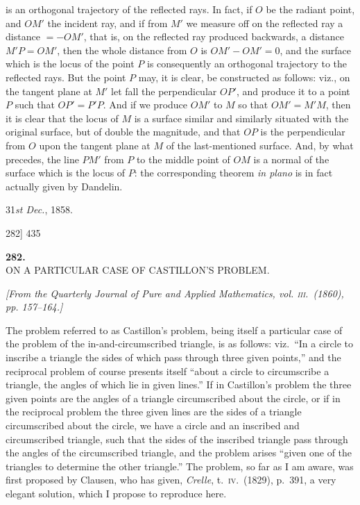 \documentclass[11pt]{article}
\begin{document}
is an orthogonal trajectory of the reflected rays. In fact, if $O$ be the radiant
point, and $OM'$ the incident ray, and if from $M'$ we measure off on the reflected
ray a distance $=-OM'$, that is, on the reflected ray produced backwards, a distance
$M'P=OM'$, then the whole distance from $O$ is $OM'-OM'=0$, and the surface which is
the locus of the point $P$ is consequently an orthogonal trajectory to the reflected
rays. But the point $P$ may, it is clear, be constructed as follows: viz., on the
tangent plane at $M'$ let fall the perpendicular $OP'$, and produce it to a point $P$
such that $OP'=P'P$. And if we produce $OM'$ to $M$ so that $OM'=M'M$, then it is
clear that the locus of $M$ is a surface similar and similarly situated with the
original surface, but of double the magnitude, and that $OP$ is the perpendicular
from $O$ upon the tangent plane at $M$ of the last-mentioned surface. And, by what
precedes, the line $PM'$ from $P$ to the middle point of $OM$ is a normal of the
surface which is the locus of $P$: the corresponding theorem \textit{in plano} is in
fact actually given by Dandelin.

\medskip
\hfill 31\textit{st Dec.}, 1858.

\bigskip
\begin{center}
\textsc{282]} \hfill \hfill 435
\end{center}

\begin{center}
\textbf{\large 282.}\\[1ex]
\textsc{ON A PARTICULAR CASE OF CASTILLON'S PROBLEM.}
\end{center}

\begin{center}
\textit{[From the Quarterly Journal of Pure and Applied Mathematics, vol. \textsc{iii}.\ (1860),
pp. 157--164.]}
\end{center}

\medskip

The problem referred to as Castillon's problem, being itself a particular case of
the problem of the in-and-circumscribed triangle, is as follows: viz.\ ``In a circle
to inscribe a triangle the sides of which pass through three given points,'' and the
reciprocal problem of course presents itself ``about a circle to circumscribe a
triangle, the angles of which lie in given lines.'' If in Castillon's problem the
three given points are the angles of a triangle circumscribed about the circle, or
if in the reciprocal problem the three given lines are the sides of a triangle
circumscribed about the circle, we have a circle and an inscribed and circumscribed
triangle, such that the sides of the inscribed triangle pass through the angles of
the circumscribed triangle, and the problem arises ``given one of the triangles to
determine the other triangle.'' The problem, so far as I am aware, was first proposed
by Clausen, who has given, \textit{Crelle}, t.\ \textsc{iv}.\ (1829), p.\ 391, a very
elegant solution, which I propose to reproduce here.
\end{document}
